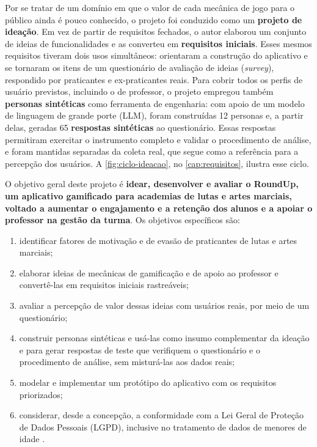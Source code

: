 Por se tratar de um domínio em que o valor de cada mecânica de jogo para
o público ainda é pouco conhecido, o projeto foi conduzido como um
\textbf{projeto de ideação}. Em vez de partir de requisitos fechados, o
autor elaborou um conjunto de ideias de funcionalidades e as converteu em
\textbf{requisitos iniciais}. Esses mesmos requisitos tiveram dois usos
simultâneos: orientaram a construção do aplicativo e se tornaram os itens
de um questionário de avaliação de ideias (\textit{survey}), respondido
por praticantes e ex-praticantes reais. Para cobrir todos os perfis de
usuário previstos, incluindo o de professor, o projeto empregou também
\textbf{personas sintéticas} como ferramenta de engenharia: com apoio de
um modelo de linguagem de grande porte (LLM), foram construídas 12
personas e, a partir delas, geradas 65 \textbf{respostas sintéticas} ao
questionário. Essas respostas permitiram exercitar o instrumento completo
e validar o procedimento de análise, e foram mantidas separadas da coleta
real, que segue como a referência para a percepção dos usuários. A \autoref{fig:ciclo-ideacao}, no
\autoref{cap:requisitos}, ilustra esse ciclo.

O objetivo geral deste projeto é \textbf{idear, desenvolver e avaliar o
RoundUp, um aplicativo gamificado para academias de lutas e artes
marciais, voltado a aumentar o engajamento e a retenção dos alunos e a
apoiar o professor na gestão da turma}. Os objetivos específicos são:

\begin{enumerate}
  \item identificar fatores de motivação e de evasão de praticantes de
        lutas e artes marciais;
  \item elaborar ideias de mecânicas de gamificação e de apoio ao
        professor e convertê-las em requisitos iniciais rastreáveis;
  \item avaliar a percepção de valor dessas ideias com usuários reais,
        por meio de um questionário;
  \item construir personas sintéticas e usá-las como insumo
        complementar da ideação e para gerar respostas de teste que
        verifiquem o questionário e o procedimento de análise, sem
        misturá-las aos dados reais;
  \item modelar e implementar um protótipo do aplicativo com os
        requisitos priorizados;
  \item considerar, desde a concepção, a conformidade com a Lei Geral de
        Proteção de Dados Pessoais (LGPD), inclusive no tratamento de dados
        de menores de idade \cite{lgpd2018}.
\end{enumerate}

